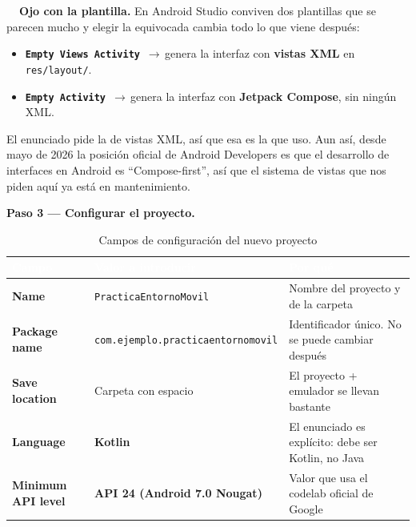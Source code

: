 \documentclass[11pt,a4paper]{article}
\newcommand{\archivo}[1]{\texttt{\color{accent!85!black}#1}}
\newcommand{\flecha}{\,$\rightarrow$\,}
\newcommand{\campo}[1]{\textbf{\color{primary}#1}}
\begin{document}
	
	\begin{warnbox}
		\textbf{\color{accent!80!black}\faExclamationTriangle\ \ Ojo con la plantilla.}
		En Android Studio conviven dos plantillas que se parecen mucho y elegir la equivocada cambia todo lo que viene después:
		\begin{itemize}[leftmargin=*,itemsep=0.15em]
			\item \textbf{\texttt{Empty Views Activity}} \flecha genera la interfaz con \textbf{vistas XML} en \archivo{res/layout/}.
			\item \textbf{\texttt{Empty Activity}} \flecha genera la interfaz con \textbf{Jetpack Compose}, sin ningún XML.
		\end{itemize}
		El enunciado pide la de vistas XML, así que esa es la que uso. Aun así, desde mayo de 2026 la posición oficial de Android Developers es que el desarrollo de interfaces en Android es \enquote{Compose-first}, así que el sistema de vistas que nos piden aquí ya está en mantenimiento.
	\end{warnbox}
	
	\campo{Paso 3 --- Configurar el proyecto.}
	
	\begin{table}[htbp]
		\centering
		\small
		\begin{tabularx}{\textwidth}{@{}>{\RaggedRight\arraybackslash}p{3cm} >{\RaggedRight\arraybackslash}p{5cm} >{\RaggedRight\arraybackslash}X@{}}
			\toprule
			\rowcolor{primary}
			\textcolor{white}{\sffamily\bfseries Campo} & \textcolor{white}{\sffamily\bfseries Valor a introducir} & \textcolor{white}{\sffamily\bfseries Por qué} \\
			\midrule
			\textbf{Name} & \archivo{PracticaEntornoMovil} & Nombre del proyecto y de la carpeta \\
			\rowcolor{soft}
			\textbf{Package name} & \archivo{com.ejemplo.practicaentornomovil} & Identificador único. No se puede cambiar después \\
			\textbf{Save location} & Carpeta con espacio & El proyecto + emulador se llevan bastante \\
			\rowcolor{soft}
			\textbf{Language} & \textbf{Kotlin} & El enunciado es explícito: debe ser Kotlin, no Java \\
			\textbf{Minimum API level} & \textbf{API 24 (Android 7.0 Nougat)} & Valor que usa el codelab oficial de Google \\
			\bottomrule
		\end{tabularx}
		\caption{Campos de configuración del nuevo proyecto}
	\end{table}
	
\end{document}
